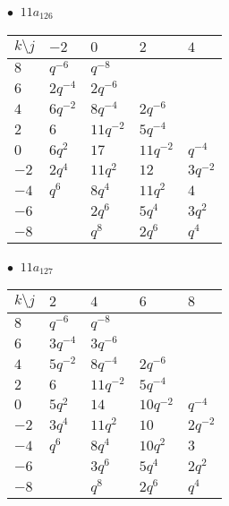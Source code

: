 \begin{minipage}{\linewidth}
$\bullet\ $ $11a_{126}$ \vspace{0.5em} \\
\begin{tabular}{l|llll}
$k \setminus j$ & $-2$ & $0$ & $2$ & $4$ \\
\hline
$8$ & $q^{-6}$ & $q^{-8}$ &  &  \\
$6$ & $2q^{-4}$ & $2q^{-6}$ &  &  \\
$4$ & $6q^{-2}$ & $8q^{-4}$ & $2q^{-6}$ &  \\
$2$ & $6$ & $11q^{-2}$ & $5q^{-4}$ &  \\
$0$ & $6q^{2}$ & $17$ & $11q^{-2}$ & $q^{-4}$ \\
$-2$ & $2q^{4}$ & $11q^{2}$ & $12$ & $3q^{-2}$ \\
$-4$ & $q^{6}$ & $8q^{4}$ & $11q^{2}$ & $4$ \\
$-6$ &  & $2q^{6}$ & $5q^{4}$ & $3q^{2}$ \\
$-8$ &  & $q^{8}$ & $2q^{6}$ & $q^{4}$ \\
\end{tabular}
\vspace{2em}
\end{minipage}
%
\begin{minipage}{\linewidth}
$\bullet\ $ $11a_{127}$ \vspace{0.5em} \\
\begin{tabular}{l|llll}
$k \setminus j$ & $2$ & $4$ & $6$ & $8$ \\
\hline
$8$ & $q^{-6}$ & $q^{-8}$ &  &  \\
$6$ & $3q^{-4}$ & $3q^{-6}$ &  &  \\
$4$ & $5q^{-2}$ & $8q^{-4}$ & $2q^{-6}$ &  \\
$2$ & $6$ & $11q^{-2}$ & $5q^{-4}$ &  \\
$0$ & $5q^{2}$ & $14$ & $10q^{-2}$ & $q^{-4}$ \\
$-2$ & $3q^{4}$ & $11q^{2}$ & $10$ & $2q^{-2}$ \\
$-4$ & $q^{6}$ & $8q^{4}$ & $10q^{2}$ & $3$ \\
$-6$ &  & $3q^{6}$ & $5q^{4}$ & $2q^{2}$ \\
$-8$ &  & $q^{8}$ & $2q^{6}$ & $q^{4}$ \\
\end{tabular}
\vspace{2em}
\end{minipage}
%
